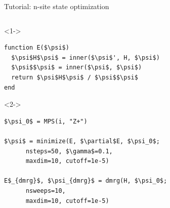 \begin{frame}[fragile]{Tutorial: n-site state optimization}

\begin{columns}

\begin{column}{5cm}

\begin{onlyenv}<1->
\begin{lstlisting}[language=JuliaLocal, style=julia, mathescape, basicstyle=\small]
function E($\psi$)
  $\psi$H$\psi$ = inner($\psi$', H, $\psi$)
  $\psi$$\psi$ = inner($\psi$, $\psi$)
  return $\psi$H$\psi$ / $\psi$$\psi$
end
\end{lstlisting}
\end{onlyenv}

\begin{onlyenv}<2->
\begin{lstlisting}[language=JuliaLocal, style=julia, mathescape, basicstyle=\small]
$\psi_0$ = MPS(i, "Z+")

$\psi$ = minimize(E, $\partial$E, $\psi_0$;
      nsteps=50, $\gamma$=0.1,
      maxdim=10, cutoff=1e-5)

E$_{dmrg}$, $\psi_{dmrg}$ = dmrg(H, $\psi_0$;
      nsweeps=10,
      maxdim=10, cutoff=1e-5)
\end{lstlisting}
\end{onlyenv}

\end{column}

\begin{column}{5.5cm}



\end{column}
\end{columns}
\end{frame}

